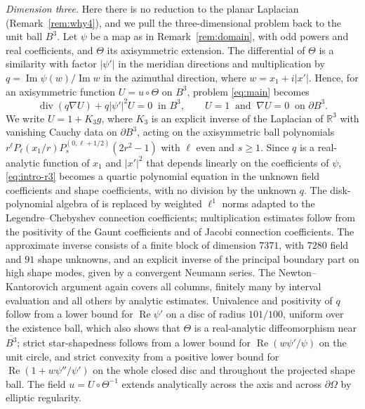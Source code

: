 \documentclass[11pt]{amsart}
\theoremstyle{definition}
\theoremstyle{remark}
\numberwithin{equation}{section}
\newcommand{\R}{\mathbb{R}}
\DeclareMathOperator{\re}{Re}
\DeclareMathOperator{\im}{Im}
\begin{document}
\emph{Dimension three.} Here there is no reduction to the planar Laplacian (Remark~\ref{rem:why4}), and we pull the three-dimensional problem back to the unit ball $B^3$. Let $\psi$ be a map as in Remark~\ref{rem:domain}, with odd powers and real coefficients, and $\Theta$ its axisymmetric extension. The differential of $\Theta$ is a similarity with factor $|\psi'|$ in the meridian directions and multiplication by $q=\im\psi(w)/\im w$ in the azimuthal direction, where $w=x_1+i|x'|$. Hence, for an axisymmetric function $U=u\circ\Theta$ on $B^3$, problem \eqref{eq:main} becomes
\begin{equation}\label{eq:intro-r3}
\operatorname{div}(q\nabla U)+q|\psi'|^2U=0\ \text{ in }B^3,\qquad U=1\ \text{ and }\ \nabla U=0\ \text{ on }\partial B^3 .
\end{equation}
We write $U=1+K_3g$, where $K_3$ is an explicit inverse of the Laplacian of $\R^3$ with vanishing Cauchy data on $\partial B^3$, acting on the axisymmetric ball polynomials $r^\ell P_\ell(x_1/r)P^{(0,\ell+1/2)}_s(2r^2-1)$ with $\ell$ even and $s\geq1$. Since $q$ is a real-analytic function of $x_1$ and $|x'|^2$ that depends linearly on the coefficients of $\psi$, \eqref{eq:intro-r3} becomes a quartic polynomial equation in the unknown field coefficients and shape coefficients, with no division by the unknown $q$. The disk-polynomial algebra of \cite{CS26} is replaced by weighted $\ell^1$ norms adapted to the Legendre--Chebyshev connection coefficients; multiplication estimates follow from the positivity of the Gaunt coefficients and of Jacobi connection coefficients. The approximate inverse consists of a finite block of dimension $7371$, with $7280$ field and $91$ shape unknowns, and an explicit inverse of the principal boundary part on high shape modes, given by a convergent Neumann series. The Newton--Kantorovich argument again covers all columns, finitely many by interval evaluation and all others by analytic estimates. Univalence and positivity of $q$ follow from a lower bound for $\re\psi'$ on a disc of radius $101/100$, uniform over the existence ball, which also shows that $\Theta$ is a real-analytic diffeomorphism near $\overline{B^3}$; strict star-shapedness follows from a lower bound for $\re(w\psi'/\psi)$ on the unit circle, and strict convexity from a positive lower bound for $\re(1+w\psi''/\psi')$ on the whole closed disc and throughout the projected shape ball. The field $u=U\circ\Theta^{-1}$ extends analytically across the axis and across $\partial\Omega$ by elliptic regularity.
\end{document}
